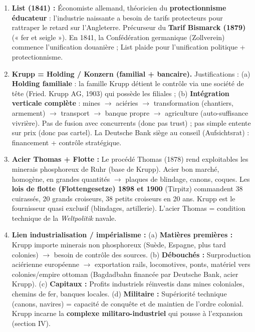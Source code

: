 \documentclass[11pt]{article}
\begin{document}
\begin{corrige}[Exercice 1]
\begin{enumerate}
    \item \textbf{List (1841) :} Économiste allemand, théoricien du \textbf{protectionnisme éducateur} : l'industrie naissante a besoin de tarifs protecteurs pour rattraper le retard sur l'Angleterre. Précurseur du \textbf{Tarif Bismarck (1879)} (« fer et seigle »). En 1841, la Confédération germanique (Zollverein) commence l'unification douanière ; List plaide pour l'unification politique + protectionnisme.
    \item \textbf{Krupp = Holding / Konzern (familial + bancaire).} Justifications : (a) \textbf{Holding familiale} : la famille Krupp détient le contrôle via une société de tête (Fried. Krupp AG, 1903) qui possède les filiales ; (b) \textbf{Intégration verticale complète} : mines $\to$ aciéries $\to$ transformation (chantiers, armement) $\to$ transport $\to$ banque propre $\to$ agriculture (auto-suffisance vivrière). Pas de fusion avec concurrents (donc pas trust) ; pas simple entente sur prix (donc pas cartel). La Deutsche Bank siège au conseil (Aufsichtsrat) : financement + contrôle stratégique.
    \item \textbf{Acier Thomas + Flotte :} Le procédé Thomas (1878) rend exploitables les minerais phosphoreux de Ruhr (base de Krupp). Acier bon marché, homogène, en grandes quantités $\to$ plaques de blindage, canons, coques. Les \textbf{lois de flotte (Flottengesetze) 1898 et 1900} (Tirpitz) commandent 38 cuirassés, 20 grands croiseurs, 38 petits croiseurs en 20 ans. Krupp est le fournisseur quasi exclusif (blindages, artillerie). L'acier Thomas = condition technique de la \emph{Weltpolitik} navale.
    \item \textbf{Lien industrialisation / impérialisme :} (a) \textbf{Matières premières :} Krupp importe minerais non phosphoreux (Suède, Espagne, plus tard colonies) $\to$ besoin de contrôle des sources. (b) \textbf{Débouchés :} Surproduction aciérienne européenne $\to$ exportation rails, locomotives, ponts, matériel vers colonies/empire ottoman (Bagdadbahn financée par Deutsche Bank, acier Krupp). (c) \textbf{Capitaux :} Profits industriels réinvestis dans mines coloniales, chemins de fer, banques locales. (d) \textbf{Militaire :} Supériorité technique (canons, navires) = capacité de conquête et de maintien de l'ordre colonial. Krupp incarne la \textbf{complexe militaro-industriel} qui pousse à l'expansion (section IV).
\end{enumerate}
\end{corrige}
\end{document}

